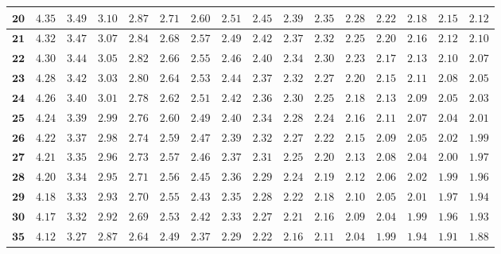 \begin{alternateColorTable}
\begin{longtable}{|r|r|r|r|r|r|r|r|r|r|r|r|r|r|r|r|}
    \(\mathbf{20}\) & \(4.35\) & \(3.49\) & \(3.10\) & \(2.87\) & \(2.71\) & \(2.60\) & \(2.51\) & \(2.45\) & \(2.39\) & \(2.35\) & \(2.28\) & \(2.22\) & \(2.18\) & \(2.15\) & \(2.12\) \\ \hline
    \(\mathbf{21}\) & \(4.32\) & \(3.47\) & \(3.07\) & \(2.84\) & \(2.68\) & \(2.57\) & \(2.49\) & \(2.42\) & \(2.37\) & \(2.32\) & \(2.25\) & \(2.20\) & \(2.16\) & \(2.12\) & \(2.10\) \\ \hline
    \(\mathbf{22}\) & \(4.30\) & \(3.44\) & \(3.05\) & \(2.82\) & \(2.66\) & \(2.55\) & \(2.46\) & \(2.40\) & \(2.34\) & \(2.30\) & \(2.23\) & \(2.17\) & \(2.13\) & \(2.10\) & \(2.07\) \\ \hline
    \(\mathbf{23}\) & \(4.28\) & \(3.42\) & \(3.03\) & \(2.80\) & \(2.64\) & \(2.53\) & \(2.44\) & \(2.37\) & \(2.32\) & \(2.27\) & \(2.20\) & \(2.15\) & \(2.11\) & \(2.08\) & \(2.05\) \\ \hline
    \(\mathbf{24}\) & \(4.26\) & \(3.40\) & \(3.01\) & \(2.78\) & \(2.62\) & \(2.51\) & \(2.42\) & \(2.36\) & \(2.30\) & \(2.25\) & \(2.18\) & \(2.13\) & \(2.09\) & \(2.05\) & \(2.03\) \\ \hline
    \(\mathbf{25}\) & \(4.24\) & \(3.39\) & \(2.99\) & \(2.76\) & \(2.60\) & \(2.49\) & \(2.40\) & \(2.34\) & \(2.28\) & \(2.24\) & \(2.16\) & \(2.11\) & \(2.07\) & \(2.04\) & \(2.01\) \\ \hline
    \(\mathbf{26}\) & \(4.22\) & \(3.37\) & \(2.98\) & \(2.74\) & \(2.59\) & \(2.47\) & \(2.39\) & \(2.32\) & \(2.27\) & \(2.22\) & \(2.15\) & \(2.09\) & \(2.05\) & \(2.02\) & \(1.99\) \\ \hline
    \(\mathbf{27}\) & \(4.21\) & \(3.35\) & \(2.96\) & \(2.73\) & \(2.57\) & \(2.46\) & \(2.37\) & \(2.31\) & \(2.25\) & \(2.20\) & \(2.13\) & \(2.08\) & \(2.04\) & \(2.00\) & \(1.97\) \\ \hline
    \(\mathbf{28}\) & \(4.20\) & \(3.34\) & \(2.95\) & \(2.71\) & \(2.56\) & \(2.45\) & \(2.36\) & \(2.29\) & \(2.24\) & \(2.19\) & \(2.12\) & \(2.06\) & \(2.02\) & \(1.99\) & \(1.96\) \\ \hline
    \(\mathbf{29}\) & \(4.18\) & \(3.33\) & \(2.93\) & \(2.70\) & \(2.55\) & \(2.43\) & \(2.35\) & \(2.28\) & \(2.22\) & \(2.18\) & \(2.10\) & \(2.05\) & \(2.01\) & \(1.97\) & \(1.94\) \\ \hline
    \(\mathbf{30}\) & \(4.17\) & \(3.32\) & \(2.92\) & \(2.69\) & \(2.53\) & \(2.42\) & \(2.33\) & \(2.27\) & \(2.21\) & \(2.16\) & \(2.09\) & \(2.04\) & \(1.99\) & \(1.96\) & \(1.93\) \\ \hline
    \(\mathbf{35}\) & \(4.12\) & \(3.27\) & \(2.87\) & \(2.64\) & \(2.49\) & \(2.37\) & \(2.29\) & \(2.22\) & \(2.16\) & \(2.11\) & \(2.04\) & \(1.99\) & \(1.94\) & \(1.91\) & \(1.88\) \\ \hline

\end{longtable}
\end{alternateColorTable}

